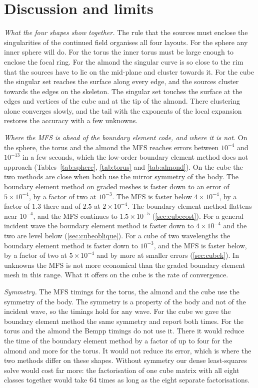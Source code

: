 \section{Discussion and limits}
\label{sec:discussion}

\emph{What the four shapes show together.} The rule that the sources must enclose the singularities of the continued field organises all four layouts. For the sphere any inner sphere will do. For the torus the inner torus must be large enough to enclose the focal ring. For the almond the singular curve is so close to the rim that the sources have to lie on the mid-plane and cluster towards it. For the cube the singular set reaches the surface along every edge, and the sources cluster towards the edges on the skeleton. The singular set touches the surface at the edges and vertices of the cube and at the tip of the almond. There clustering alone converges slowly, and the tail with the exponents of the local expansion restores the accuracy with a few unknowns.

\emph{Where the MFS is ahead of the boundary element code, and where it is not.} On the sphere, the torus and the almond the MFS reaches errors between $10^{-4}$ and $10^{-13}$ in a few seconds, which the low-order boundary element method does not approach (Tables~\ref{tab:sphere}, \ref{tab:torus} and \ref{tab:almond}). On the cube the two methods are close when both use the mirror symmetry of the body. The boundary element method on graded meshes is faster down to an error of $5\times10^{-4}$, by a factor of two at $10^{-3}$. The MFS is faster below $4\times10^{-4}$, by a factor of $1.3$ there and of $2.5$ at $2\times10^{-4}$. The boundary element method flattens near $10^{-4}$, and the MFS continues to $1.5\times10^{-5}$ (\autoref{sec:cubecost}). For a general incident wave the boundary element method is faster down to $4\times10^{-4}$ and the two are level below (\autoref{sec:cubeoblique}). For a cube of two wavelengths the boundary element method is faster down to $10^{-3}$, and the MFS is faster below, by a factor of two at $5\times10^{-4}$ and by more at smaller errors (\autoref{sec:cubek}). In unknowns the MFS is not more economical than the graded boundary element mesh in this range. What it offers on the cube is the rate of convergence.

\emph{Symmetry.} The MFS timings for the torus, the almond and the cube use the symmetry of the body. The symmetry is a property of the body and not of the incident wave, so the timings hold for any wave. For the cube we gave the boundary element method the same symmetry and report both times. For the torus and the almond the Bempp timings do not use it. There it would reduce the time of the boundary element method by a factor of up to four for the almond and more for the torus. It would not reduce its error, which is where the two methods differ on these shapes. Without symmetry our dense least-squares solve would cost far more: the factorisation of one cube matrix with all eight classes together would take $64$ times as long as the eight separate factorisations.


